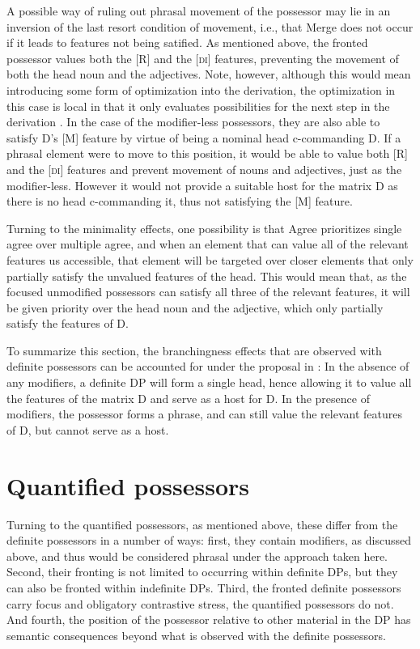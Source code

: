 \documentclass[output=paper,colorlinks,citecolor=brown,
]{langscibook}
\begin{document}
A possible way of ruling out phrasal movement of the possessor may lie in an inversion of the last resort condition of movement, i.e., that Merge does not occur if it leads to features not being satified. As mentioned above, the fronted possessor values both the [R] and the [\textsc{di}] features, preventing the movement of both the head noun and the adjectives. Note, however, although this would mean introducing some form of optimization into the derivation, the optimization in this case is local in that it only evaluates possibilities for the next step in the derivation \citep[cf.][]{heck2007,Lahne:2009va}. In the case of the modifier-less possessors, they are also able to satisfy D's [M] feature by virtue of being a nominal head c-commanding D. If a phrasal element were to move to this position, it would be able to value both [R] and the [\textsc{di}] features and prevent movement of nouns and adjectives, just as the modifier-less. However it would not provide a suitable host for the matrix D as there is no head c-commanding it, thus not satisfying the [M] feature.

Turning to the minimality effects, one possibility is that Agree prioritizes single agree over multiple agree, and when an element that can value all of the relevant features us accessible, that element will be targeted over closer elements that only partially satisfy the unvalued features of the head. This would mean that, as the focused unmodified possessors can satisfy all three of the relevant features, it will be given priority over the head noun and the adjective, which only partially satisfy the features of D.

To summarize this section, the branchingness effects that are observed with definite possessors can be accounted for under the proposal in \citet{hardarson2020}: In the absence of any modifiers, a definite DP will form a single head, hence allowing it to value all the features of the matrix D and serve as a host for D. In the presence of modifiers, the possessor forms a phrase, and can still value the relevant features of D, but cannot serve as a host.


\section{Quantified possessors}

Turning to the quantified possessors, as mentioned above, these differ from the definite possessors in a number of ways: first, they contain modifiers, as discussed above, and thus would be considered phrasal under the approach taken here. Second, their fronting is not limited to occurring within definite DPs, but they can also be fronted within indefinite DPs. Third, the fronted definite possessors carry focus and obligatory contrastive stress, the quantified possessors do not. And fourth, the position of the possessor relative to other material in the DP has semantic consequences beyond what is observed with the definite possessors.
\end{document}
